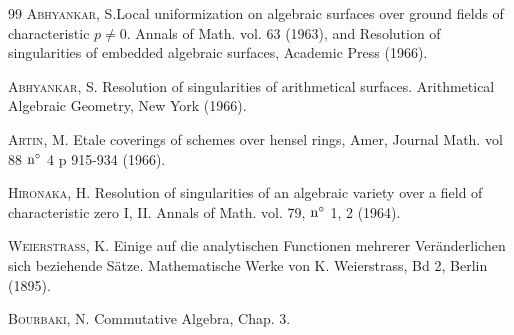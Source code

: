 \begin{thebibliography}{99}
 \textsc{Abhyankar}, S.\pageoriginale Local uniformization on
algebraic surfaces over ground fields of characteristic $p\neq
0$. Annals of Math. vol. 63 (1963), and Resolution of singularities of
embedded algebraic surfaces, Academic Press (1966).

 \textsc{Abhyankar}, S. Resolution of singularities of
arithmetical surfaces. Arithmetical Algebraic Geometry, New York
(1966).

 \textsc{Artin}, M. Etale coverings of schemes over hensel
rings, Amer, Journal Math. vol 88 ${\rm n^{\circ}}$ 4 p 915-934
(1966).

 \textsc{Hironaka}, H. Resolution of singularities of an
algebraic variety over a field of characteristic zero I, II. Annals of
Math. vol. 79, ${\rm n^{\circ}}$ 1, 2 (1964).

 \textsc{Weierstrass}, K. Einige auf die analytischen
Functionen mehrerer Veränderlichen sich beziehende
Sätze. Mathematische Werke von K. Weierstrass, Bd 2, Berlin (1895).

 \textsc{Bourbaki}, N. Commutative Algebra, Chap. 3.
\end{thebibliography}



\ifx\danslelivre\undefined
\let\SGAXIXenddocument\enddocument
\else
\let\SGAXIXenddocument\relax
\fi
\SGAXIXenddocument

